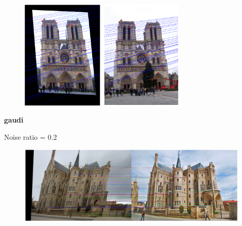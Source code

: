 \documentclass[11pt]{article}
\begin{document}
\begin{figure}[H]
    \centering
    \includegraphics[width=4cm]{images/part3/ransac_image_2_noise_0.2_left.png}
    \includegraphics[width=4cm]{images/part3/ransac_image_2_noise_0.2_right.png}
\end{figure}

\textbf{gaudi}

Noise ratio = 0.2
\begin{figure}[H]
    \centering
    \includegraphics[width=14cm]{images/part3/ransac_image_3_noise_0.2_1.png}
\end{figure}
\end{document}

